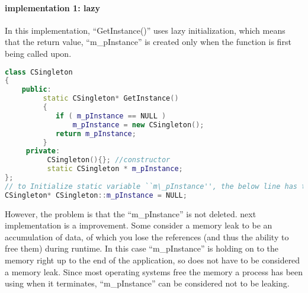 \documentclass{book}
\begin{document}
\paragraph{implementation 1: lazy}
In this implementation, ``GetInstance()'' uses lazy initialization, which means that the return value, ``m\_pInstance'' is created only when the function is first being called upon.
\begin{lstlisting}[caption={sample code 1: lazily-initialized Singleton},language=C++]
class CSingleton  
{  
    public:  
         static CSingleton* GetInstance()  
         {  
            if ( m_pInstance == NULL )    
                m_pInstance = new CSingleton();  
            return m_pInstance;  
         }  
     private:  
          CSingleton(){}; //constructor 
          static CSingleton * m_pInstance;  
};  
// to Initialize static variable ``m\_pInstance'', the below line has to be added into the corresponding cpp file like, 
CSingleton* CSingleton::m_pInstance = NULL;
\end{lstlisting}
However, the problem is that the ``m\_pInstance'' is not deleted. next implementation is a improvement.
Some consider a memory leak to be an accumulation of data, of which you lose the references (and thus the ability to free them) during runtime.
In this case ``m\_pInstance'' is holding on to the memory right up to the end of the application, so does not have to be considered a memory leak.
Since most operating systems free the memory a process has been using when it terminates, ``m\_pInstance'' can be considered not to be leaking.
\end{document}
